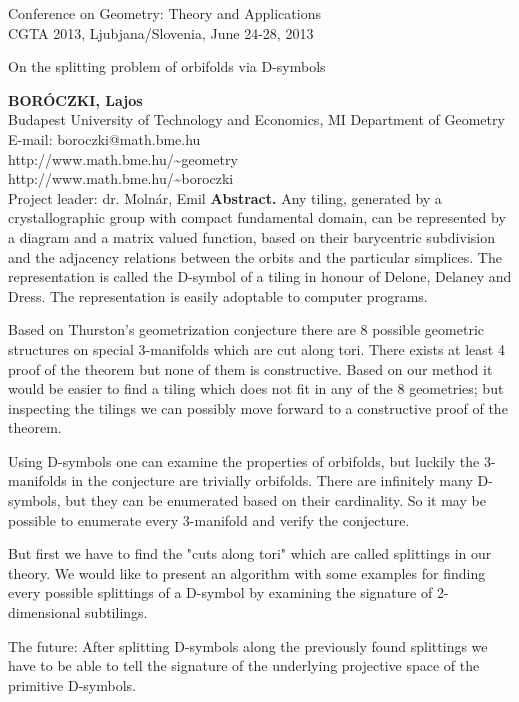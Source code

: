 \documentclass[a4paper]{article}
\begin{document}
\small
Conference on Geometry: Theory and Applications\\
CGTA 2013, Ljubjana/Slovenia, June 24-28, 2013
\vfill
\large
\begin{center} 
  On the splitting problem of orbifolds via D-symbols
\end{center}
\vfill
\small
\textbf{BORÓCZKI, Lajos}\\
Budapest University of Technology and Economics, MI Department of Geometry\\
E-mail: boroczki@math.bme.hu\\
http://www.math.bme.hu/\textasciitilde geometry\\
http://www.math.bme.hu/\textasciitilde boroczki\\
Project leader: dr. Molnár, Emil
\vfill
\small
\textbf{Abstract.} Any tiling, generated by a crystallographic group with
compact fundamental domain, can be represented by a diagram and a matrix valued
function, based on their barycentric subdivision and the adjacency relations
between the orbits and the particular simplices. The representation is called
the D-symbol of a tiling in honour of Delone, Delaney and Dress. The
representation is easily adoptable to computer programs.

Based on Thurston's geometrization conjecture there are 8 possible geometric
structures on special 3-manifolds which are cut along tori. There exists at
least 4 proof of the theorem but none of them is constructive. Based on our
method it would be easier to find a tiling which does not fit in any of the 8
geometries; but inspecting the tilings we can possibly move forward to a
constructive proof of the theorem.

Using D-symbols one can examine the properties of orbifolds, but luckily the
3-manifolds in the conjecture are trivially orbifolds. There are infinitely many
D-symbols, but they can be enumerated based on their cardinality. So it may be
possible to enumerate every 3-manifold and verify the conjecture.

But first we have to find the "cuts along tori" which are called splittings in
our theory. We would like to present an algorithm with some examples for finding
every possible splittings of a D-symbol by examining the signature of
2-dimensional subtilings.

The future: After splitting D-symbols along the previously found splittings we
have to be able to tell the signature of the underlying projective space of the
primitive D-symbols.
\vfill
\vfill
\end{document}
